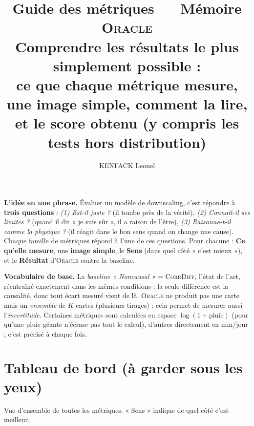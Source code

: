 \documentclass[11pt,a4paper]{article}
\title{\textcolor{bleu}{\textbf{Guide des métriques --- Mémoire \textsc{Oracle}}}\\[2mm]
\large Comprendre les résultats le plus simplement possible :\\ ce que chaque métrique mesure, une image simple, comment la lire, et le score obtenu (y compris les tests hors distribution)}
\author{KENFACK Leonel}
\date{}
\newcommand{\Oracle}{\textsc{Oracle}}
\newcommand{\CorrDiff}{\textsc{CorrDiff}}
\begin{document}
\maketitle

\begin{mdframed}[backgroundcolor=grisclair,linecolor=bleu,linewidth=0.6pt,roundcorner=3pt]
\textbf{L'idée en une phrase.} Évaluer un modèle de downscaling, c'est répondre à \textbf{trois questions} : \emph{(1) Est-il juste ?} (il tombe près de la vérité), \emph{(2) Connaît-il ses limites ?} (quand il dit « je suis sûr », il a raison de l'être), \emph{(3) Raisonne-t-il comme la physique ?} (il réagit dans le bon sens quand on change une cause). Chaque famille de métriques répond à l'une de ces questions. Pour chacune : \textcolor{accent}{\textbf{Ce qu'elle mesure}}, une \textcolor{accent}{\textbf{image simple}}, le \textcolor{vert}{\textbf{Sens}} (dans quel côté « c'est mieux »), et le \textcolor{accent}{\textbf{Résultat}} d'\Oracle{} contre la baseline.

\textbf{Vocabulaire de base.} La \emph{baseline « Noncausal »} = \CorrDiff{}, l'état de l'art, réentraîné exactement dans les mêmes conditions ; la seule différence est la causalité, donc tout écart mesuré vient de là. \Oracle{} ne produit pas une carte mais un \emph{ensemble} de $K$ cartes (plusieurs tirages) : cela permet de mesurer aussi l'\emph{incertitude}. Certaines métriques sont calculées en espace $\log(1+\mathrm{pluie})$ (pour qu'une pluie géante n'écrase pas tout le calcul), d'autres directement en mm/jour ; c'est précisé à chaque fois.
\end{mdframed}

\tableofcontents
\newpage

\section{Tableau de bord (à garder sous les yeux)}

Vue d'ensemble de toutes les métriques. « Sens » indique de quel côté c'est meilleur.
\end{document}
